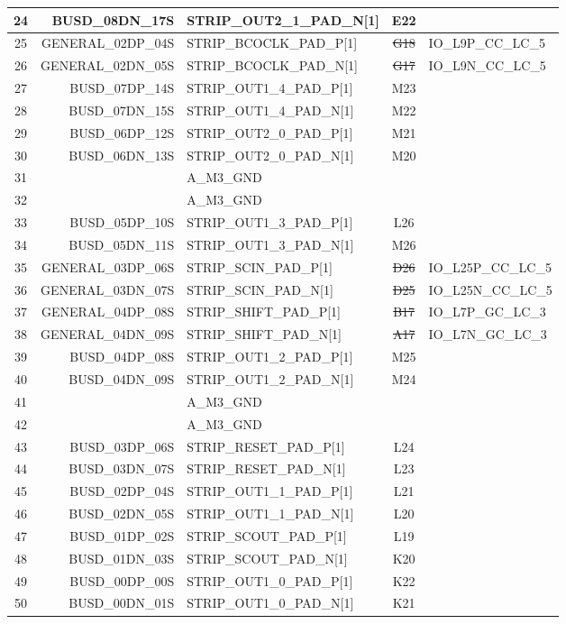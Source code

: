 \documentclass[11pt]{article}
\begin{document}
\begin{table}
\begin{center}
\begin{tabular}{|c|r|l|c|l|}
24 & BUSD\_08DN\_17S & STRIP\_OUT2\_1\_PAD\_N[1]   & E22 & \\ \hline
25 & GENERAL\_02DP\_04S & STRIP\_BCOCLK\_PAD\_P[1] & \sout{G18} & IO\_L9P\_CC\_LC\_5 \\
26 & GENERAL\_02DN\_05S & STRIP\_BCOCLK\_PAD\_N[1] & \sout{G17} &IO\_L9N\_CC\_LC\_5 \\ \hline
27 &  BUSD\_07DP\_14S & STRIP\_OUT1\_4\_PAD\_P[1]  & M23 & \\
28 &  BUSD\_07DN\_15S & STRIP\_OUT1\_4\_PAD\_N[1]  & M22 & \\ \hline
29 &  BUSD\_06DP\_12S & STRIP\_OUT2\_0\_PAD\_P[1]  & M21 & \\
30 &  BUSD\_06DN\_13S & STRIP\_OUT2\_0\_PAD\_N[1]  & M20 & \\ \hline
31 &                & A\_M3\_GND               &     & \\
32 &                & A\_M3\_GND               &     & \\ \hline
33 &  BUSD\_05DP\_10S & STRIP\_OUT1\_3\_PAD\_P[1]  & L26 & \\
34 &  BUSD\_05DN\_11S & STRIP\_OUT1\_3\_PAD\_N[1]  & M26 & \\ \hline
35 & GENERAL\_03DP\_06S & STRIP\_SCIN\_PAD\_P[1]  & \sout{D26}& IO\_L25P\_CC\_LC\_5 \\
36 & GENERAL\_03DN\_07S & STRIP\_SCIN\_PAD\_N[1]  & \sout{D25}& IO\_L25N\_CC\_LC\_5  \\ \hline
37 & GENERAL\_04DP\_08S & STRIP\_SHIFT\_PAD\_P[1] & \sout{B17} & IO\_L7P\_GC\_LC\_3 \\
38 & GENERAL\_04DN\_09S & STRIP\_SHIFT\_PAD\_N[1] & \sout{A17} & IO\_L7N\_GC\_LC\_3  \\ \hline
39 &  BUSD\_04DP\_08S & STRIP\_OUT1\_2\_PAD\_P[1]  & M25 & \\
40 &  BUSD\_04DN\_09S & STRIP\_OUT1\_2\_PAD\_N[1]  & M24 & \\ \hline
41 &                & A\_M3\_GND               &     & \\
42 &                & A\_M3\_GND               &     & \\ \hline
43 &  BUSD\_03DP\_06S & STRIP\_RESET\_PAD\_P[1]   &  L24 & \\
44 &  BUSD\_03DN\_07S & STRIP\_RESET\_PAD\_N[1]   &  L23 & \\ \hline
45 &  BUSD\_02DP\_04S & STRIP\_OUT1\_1\_PAD\_P[1]  &  L21 & \\
46 &  BUSD\_02DN\_05S & STRIP\_OUT1\_1\_PAD\_N[1]  &  L20 & \\ \hline
47 &  BUSD\_01DP\_02S & STRIP\_SCOUT\_PAD\_P[1]   &  L19 & \\
48 &  BUSD\_01DN\_03S & STRIP\_SCOUT\_PAD\_N[1]   &  K20 & \\ \hline
49 &  BUSD\_00DP\_00S & STRIP\_OUT1\_0\_PAD\_P[1]  &  K22 & \\
50 &  BUSD\_00DN\_01S & STRIP\_OUT1\_0\_PAD\_N[1]  &  K21 & \\ \hline
\end{tabular}
\end{center}
\end{table}
\end{document}
